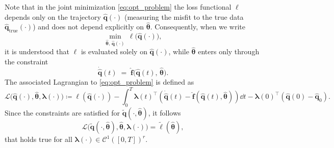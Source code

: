 Note that in the joint minimization \eqref{eq:opt_problem} the loss functional \(\ell\) depends only on the trajectory \(\hat{\mathbf{q}}(\cdot)\) (measuring the misfit to the true data \(\hat{\mathbf{q}}_{\mathrm{true}}(\cdot)\)) and does not depend explicitly on \(\hat{\bm{\theta}}\). Consequently, when we write\\
\[
    \min_{\hat{\bm{\theta}},\,\hat{\mathbf{q}}(\cdot)}\,\ell\bigl(\hat{\mathbf{q}}(\cdot)\bigr),
\]
it is understood that \(\ell\) is evaluated solely on \(\hat{\mathbf{q}}(\cdot)\), while \(\hat{\bm{\theta}}\) enters only through the constraint\\ 
\[
    \dot{\hat{\mathbf{q}}}(t) \;=\; 
    \hat{\mathbf{f}}\bigl(\hat{\mathbf{q}}(t),\,\hat{\bm{\theta}}\bigr).
\]
The associated Lagrangian to \eqref{eq:opt_problem} is defined as\\
\begin{equation}
        \mathscr{L}\bigl(\hat{\mathbf{q}}(\cdot),\hat{\bm{\theta}},\bm{\lambda}(\cdot)\bigr) \coloneqq \ell(\hat{\mathbf{q}}(\cdot)) - \int_0^T \bm{\lambda}(t)^{\top}\left( \dot{\hat{\mathbf{q}}}(t)-\hat{\mathbf{f}}(\hat{\mathbf{q}}(t),\hat{\bm{\theta}}) \right)\dd t - \bm{\lambda}(0)^{\top}(\hat{\mathbf{q}}(0)-\hat{\mathbf{q}}_0).
        \label{eq:lagrange_cost}
    \end{equation}
Since the constraints are satisfied for $\tilde{\mathbf{q}}(\cdot,\hat{\bm{\theta}})$, it follows\\
\begin{equation}
    \mathscr{L}\bigl(\tilde{\mathbf{q}}(\cdot,\hat{\bm{\theta}}),\hat{\bm{\theta}}, \bm{\lambda}(\cdot)\bigr) = \tilde{\ell} (\hat{\bm{\theta}}),
    \label{eq:lambdaeq}
\end{equation}
that holds true for all $\bm{\lambda}(\cdot)\in\mathcal{C}^1([0,T])^r$. 

